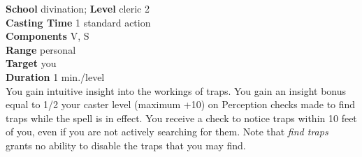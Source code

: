 \textbf{School} divination; \textbf{Level} cleric 2\\
\textbf{Casting Time} 1 standard action\\
\textbf{Components} V, S\\
\textbf{Range} personal\\
\textbf{Target} you\\
\textbf{Duration} 1 min./level\\
You gain intuitive insight into the workings of traps. You gain an insight bonus equal to 1/2 your caster level (maximum +10) on Perception checks made to find traps while the spell is in effect. You receive a check to notice traps within 10 feet of you, even if you are not actively searching for them. Note that \textit{find traps }grants no ability to disable the traps that you may find.\\
